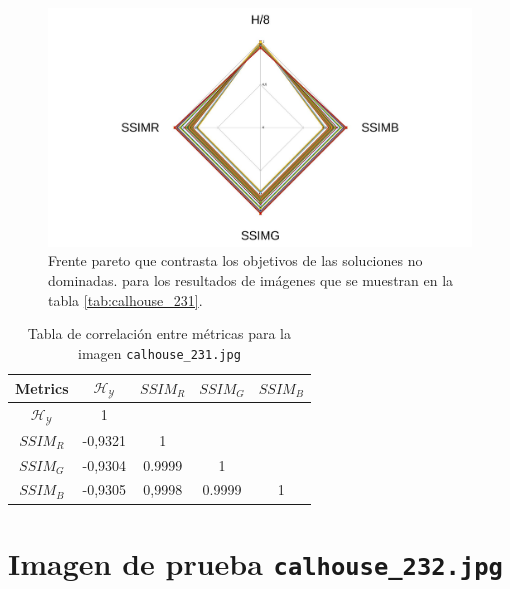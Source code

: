     \begin{figure}[H]
    \centering
    \includegraphics[width=\textwidth]{./Figures/calhouse_231/calhouse_231_2.jpg}
    \caption{Frente pareto que contrasta los objetivos de las soluciones no dominadas. para los resultados de imágenes que se muestran en la tabla \ref{tab:calhouse_231}.}
    \label{fig:calhouse2312fp}
    \end{figure}

\begin{table}[H]
\setlength{\abovecaptionskip}{2pt plus 3pt minus 2pt} %
\caption[Parámetros de entrada para $MOPSO$]{Tabla de correlación entre métricas para la imagen \texttt{calhouse\_231.jpg}}
\begin{center}
 \begin{tabular}{||c | c c c c||} 
 \hline
Metrics & $\mathscr{H_Y}$ & $SSIM_R$ & $SSIM_G$ & $SSIM_B$ \\ 
\hline
$\mathscr{H_Y}$ & 1 &  &  & \\ 
\hline
$SSIM_R$ & -0,9321 & 1 &  \\ 
\hline
$SSIM_G$ & -0,9304 & 0.9999  & 1  & \\ 
\hline
$SSIM_B$ & -0,9305 & 0,9998  & 0.9999  & 1 \\ 
\hline
\end{tabular}
\end{center}
\label{table:correlacion}
\end{table}

\section{Imagen de prueba \texttt{calhouse\_232.jpg}}

